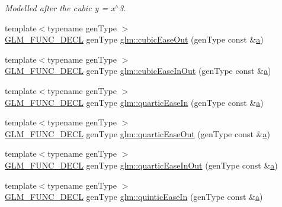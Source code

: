 \begin{DoxyCompactItemize}
\begin{DoxyCompactList}\small\item\em Modelled after the cubic y = x$^\wedge$3. \end{DoxyCompactList}\item 
{\footnotesize template$<$typename gen\+Type $>$ }\\\mbox{\hyperlink{setup_8hpp_ab2d052de21a70539923e9bcbf6e83a51}{G\+L\+M\+\_\+\+F\+U\+N\+C\+\_\+\+D\+E\+CL}} gen\+Type \mbox{\hyperlink{group__gtx__easing_ga40d746385d8bcc5973f5bc6a2340ca91}{glm\+::cubic\+Ease\+Out}} (gen\+Type const \&\mbox{\hyperlink{_s_d_l__opengl__glext_8h_a3309789fc188587d666cda5ece79cf82}{a}})
\item 
{\footnotesize template$<$typename gen\+Type $>$ }\\\mbox{\hyperlink{setup_8hpp_ab2d052de21a70539923e9bcbf6e83a51}{G\+L\+M\+\_\+\+F\+U\+N\+C\+\_\+\+D\+E\+CL}} gen\+Type \mbox{\hyperlink{group__gtx__easing_ga55134072b42d75452189321d4a2ad91c}{glm\+::cubic\+Ease\+In\+Out}} (gen\+Type const \&\mbox{\hyperlink{_s_d_l__opengl__glext_8h_a3309789fc188587d666cda5ece79cf82}{a}})
\item 
{\footnotesize template$<$typename gen\+Type $>$ }\\\mbox{\hyperlink{setup_8hpp_ab2d052de21a70539923e9bcbf6e83a51}{G\+L\+M\+\_\+\+F\+U\+N\+C\+\_\+\+D\+E\+CL}} gen\+Type \mbox{\hyperlink{group__gtx__easing_ga808b41f14514f47dad5dcc69eb924afd}{glm\+::quartic\+Ease\+In}} (gen\+Type const \&\mbox{\hyperlink{_s_d_l__opengl__glext_8h_a3309789fc188587d666cda5ece79cf82}{a}})
\item 
{\footnotesize template$<$typename gen\+Type $>$ }\\\mbox{\hyperlink{setup_8hpp_ab2d052de21a70539923e9bcbf6e83a51}{G\+L\+M\+\_\+\+F\+U\+N\+C\+\_\+\+D\+E\+CL}} gen\+Type \mbox{\hyperlink{group__gtx__easing_ga4dfb33fa7664aa888eb647999d329b98}{glm\+::quartic\+Ease\+Out}} (gen\+Type const \&\mbox{\hyperlink{_s_d_l__opengl__glext_8h_a3309789fc188587d666cda5ece79cf82}{a}})
\item 
{\footnotesize template$<$typename gen\+Type $>$ }\\\mbox{\hyperlink{setup_8hpp_ab2d052de21a70539923e9bcbf6e83a51}{G\+L\+M\+\_\+\+F\+U\+N\+C\+\_\+\+D\+E\+CL}} gen\+Type \mbox{\hyperlink{group__gtx__easing_ga6d000f852de12b197e154f234b20c505}{glm\+::quartic\+Ease\+In\+Out}} (gen\+Type const \&\mbox{\hyperlink{_s_d_l__opengl__glext_8h_a3309789fc188587d666cda5ece79cf82}{a}})
\item 
{\footnotesize template$<$typename gen\+Type $>$ }\\\mbox{\hyperlink{setup_8hpp_ab2d052de21a70539923e9bcbf6e83a51}{G\+L\+M\+\_\+\+F\+U\+N\+C\+\_\+\+D\+E\+CL}} gen\+Type \mbox{\hyperlink{group__gtx__easing_ga097579d8e087dcf48037588140a21640}{glm\+::quintic\+Ease\+In}} (gen\+Type const \&\mbox{\hyperlink{_s_d_l__opengl__glext_8h_a3309789fc188587d666cda5ece79cf82}{a}})

\end{DoxyCompactItemize}
